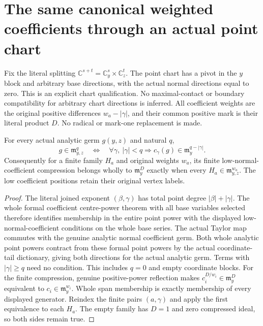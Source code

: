 \section{The same canonical weighted coefficients through an actual point chart}

Fix the literal splitting $\mathbb C^{s+t}=\mathbb C^s_y\times\mathbb C^t_z$.
The point chart has a pivot in the $y$ block and arbitrary base directions,
with the actual normal directions equal to zero. This is an explicit chart
qualification. No maximal-contact or boundary compatibility for arbitrary
chart directions is inferred. All coefficient weights are the original
positive differences $w_a-|\gamma|$, and their common positive mark is their
literal product $D$. No radical or mark-one replacement is made.

\begin{theorem}
\label{hir:actual-point-power-finite-weighted-coefficient-iff}
\leanok
For every actual analytic germ $g(y,z)$ and natural $q$,
\[
 g\in\mathfrak m_{y,z}^q\quad\Longleftrightarrow\quad
 \forall\gamma,\ |\gamma|<q\Longrightarrow
 c_\gamma(g)\in\mathfrak m_y^{q-|\gamma|}.
\]
Consequently for a finite family $H_a$ and original weights $w_a$, its
finite low-normal-coefficient compression belongs wholly to
$\mathfrak m_y^D$ exactly when every $H_a\in\mathfrak m_{y,z}^{w_a}$.
The low coefficient positions retain their original vertex labels.
\end{theorem}
\begin{proof}
The literal joined exponent $(\beta,\gamma)$ has total point degree
$|\beta|+|\gamma|$. The whole formal coefficient centre-power theorem with
all base variables selected therefore identifies membership in the entire
point power with the displayed low-normal-coefficient conditions on the
whole base series. The actual Taylor map commutes with the genuine analytic
normal coefficient germ. Both whole analytic point powers contract from
these formal point powers by the actual coordinate-tail dictionary, giving
both directions for the actual analytic germ. Terms with $|\gamma|\ge q$
need no condition. This includes $q=0$ and empty coordinate blocks.
For the finite compression, genuine positive-power reflection makes
$c_i^{D/w_i}\in\mathfrak m_y^D$ equivalent to
$c_i\in\mathfrak m_y^{w_i}$. Whole span membership is exactly membership
of every displayed generator. Reindex the finite pairs $(a,\gamma)$ and
apply the first equivalence to each $H_a$. The empty family has $D=1$ and
zero compressed ideal, so both sides remain true.
\end{proof}

